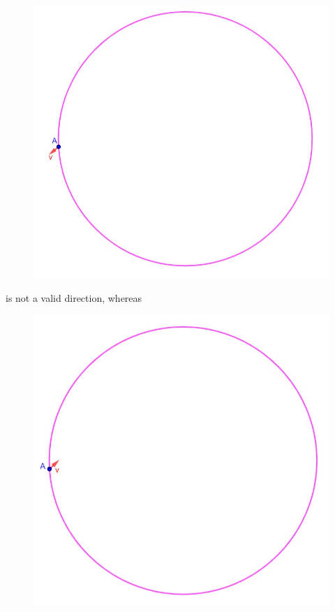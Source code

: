 \documentclass[11pt]{article}
\begin{document}
\begin{center}
	\begin{figure}[h]
		\includegraphics[scale=0.6]{circle_2.jpg}
	\end{figure}
\end{center}
is not a valid direction, whereas
\begin{center}
	\begin{figure}[h]
		\includegraphics[scale=0.59]{circle_3.jpg}
	\end{figure}
\end{center}
\end{document}
